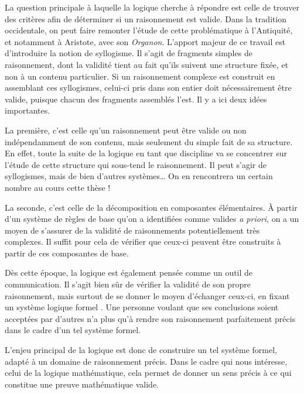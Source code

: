 La question principale à laquelle la logique cherche à répondre
est celle de trouver des critères afin de déterminer si un raisonnement est valide.
Dans la tradition occidentale, on peut faire remonter l’étude de cette problématique
à l’Antiquité, et notamment à Aristote, avec son \textit{Organon}.
L’apport majeur de ce travail est d’introduire la notion de syllogisme.
Il s’agit de fragments simples de raisonnement, dont la validité tient au fait qu’ils
suivent une structure fixée, et non à un contenu particulier.%
Si un raisonnement complexe est construit en assemblant ces syllogismes,
celui-ci pris dans son entier doit nécessairement être valide, puisque
chacun des fragments assemblés l’est. Il y a ici deux idées importantes.

La première, c’est celle qu’un raisonnement peut être
valide ou non indépendamment de son contenu, mais seulement du simple fait de sa structure.
En effet, toute la suite de la logique en tant que discipline va se concentrer sur l’étude
de cette structure qui sous-tend le raisonnement.
Il peut s’agir de syllogismes, mais de bien d’autres systèmes… On en rencontrera
un certain nombre au cours cette thèse !

La seconde, c’est celle de la décomposition en composantes élémentaires. À
partir d’un système de règles de base qu’on a identifiées comme valides 
\textit{a priori}, on a un moyen de s’assurer de la validité
de raisonnements potentiellement très complexes.
Il suffit pour cela de vérifier que ceux-ci peuvent être construits à partir de
ces composantes de base.

Dès cette époque, la logique est également pensée comme un outil de communication.
Il s’agit bien sûr de vérifier la validité de son propre raisonnement,
mais surtout de se donner le moyen d’échanger ceux-ci,
en fixant un système logique formel%
.
Une personne voulant que ses conclusions soient acceptées par d’autres n’a plus qu’à
rendre son raisonnement parfaitement précis dans le cadre d’un tel système formel.

L’enjeu principal de la logique est donc de construire un tel système formel,
adapté à un domaine de raisonnement précis. Dans le cadre qui nous intéresse,
celui de la logique mathématique, cela permet de donner un sens précis à
ce qui constitue une preuve mathématique valide.

